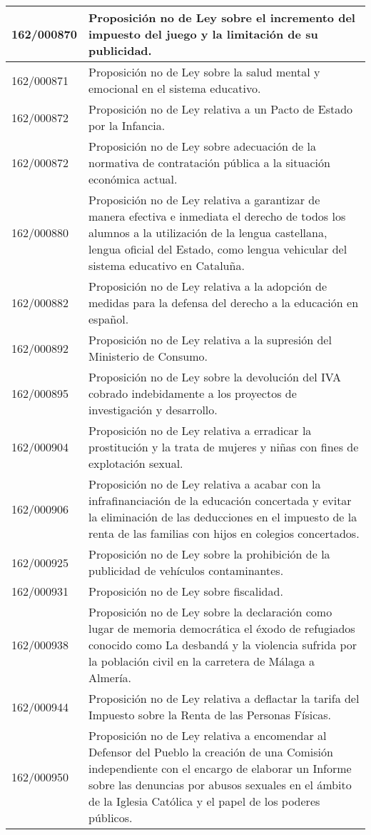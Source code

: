 {\begin{table}[H]
\begin{center}
\begin{tabularx}{\linewidth}{| l | X |}
\hline
162/000870 & Proposición no de Ley sobre el incremento del impuesto del juego y la limitación de su publicidad. \\
\hline
162/000871 & Proposición no de Ley sobre la salud mental y emocional en el sistema educativo. \\
\hline
162/000872 & Proposición no de Ley relativa a un Pacto de Estado por la Infancia. \\
\hline
162/000872 & Proposición no de Ley sobre adecuación de la normativa de contratación pública a la situación económica actual. \\
\hline
162/000880 & Proposición no de Ley relativa a garantizar de manera efectiva e inmediata el derecho de todos los alumnos a la utilización de la lengua castellana, lengua oficial del Estado, como lengua vehicular del sistema educativo en Cataluña. \\
\hline
162/000882 & Proposición no de Ley relativa a la adopción de medidas para la defensa del derecho a la educación en español. \\
\hline
162/000892 & Proposición no de Ley relativa a la supresión del Ministerio de Consumo. \\
\hline
162/000895 & Proposición no de Ley sobre la devolución del IVA cobrado indebidamente a los proyectos de investigación y desarrollo. \\
\hline
162/000904 & Proposición no de Ley relativa a erradicar la prostitución y la trata de mujeres y niñas con fines de explotación sexual. \\
\hline
162/000906 & Proposición no de Ley relativa a acabar con la infrafinanciación de la educación concertada y evitar la eliminación de las deducciones en el impuesto de la renta de las familias con hijos en colegios concertados. \\
\hline
162/000925 & Proposición no de Ley sobre la prohibición de la publicidad de vehículos contaminantes. \\
\hline
162/000931 & Proposición no de Ley sobre fiscalidad. \\
\hline
162/000938 & Proposición no de Ley sobre la declaración como lugar de memoria democrática el éxodo de refugiados conocido como La desbandá y la violencia sufrida por la población civil en la carretera de Málaga a Almería. \\
\hline
162/000944 & Proposición no de Ley relativa a deflactar la tarifa del Impuesto sobre la Renta de las Personas Físicas. \\
\hline
162/000950 & Proposición no de Ley relativa a encomendar al Defensor del Pueblo la creación de una Comisión independiente con el encargo de elaborar un Informe sobre las denuncias por abusos sexuales en el ámbito de la Iglesia Católica y el papel de los poderes públicos. \\

\end{tabularx}
\end{center}
\end{table}}
